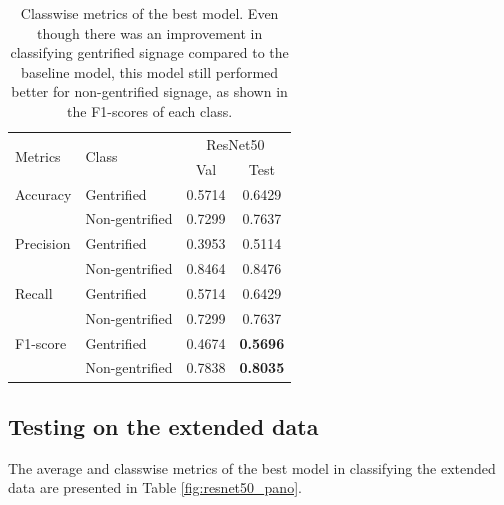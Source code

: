 \begin{table}[h!]
\begin{tabular}{llcc}
\toprule
\multirow{2}{*}{Metrics}   & \multirow{2}{*}{Class} & \multicolumn{2}{c}{ResNet50} \\ \cline{3-4} 
                           &                        & Val           & Test         \\ \hline
Accuracy                   & Gentrified             & 0.5714        & 0.6429       \\
                           & Non-gentrified         & 0.7299        & 0.7637       \\
Precision                  & Gentrified             & 0.3953        & 0.5114       \\
                           & Non-gentrified         & 0.8464        & 0.8476       \\
Recall                     & Gentrified             & 0.5714        & 0.6429       \\
                           & Non-gentrified         & 0.7299        & 0.7637       \\
F1-score                   & Gentrified             & 0.4674        & \textbf{0.5696}       \\
                           & Non-gentrified         & 0.7838        & \textbf{0.8035}       \\
\bottomrule
\end{tabular}
\vspace{\baselineskip}
\caption{Classwise metrics of the best model. Even though there was an improvement in classifying gentrified signage compared to the baseline model, this model still performed better for non-gentrified signage, as shown in the F1-scores of each class.}
\label{fig:resnet50_cls}
\vspace{-7mm}
\end{table}

\subsection{Testing on the extended data}
The average and classwise metrics of the best model in classifying the extended data are presented in Table \ref{fig:resnet50_pano}.

